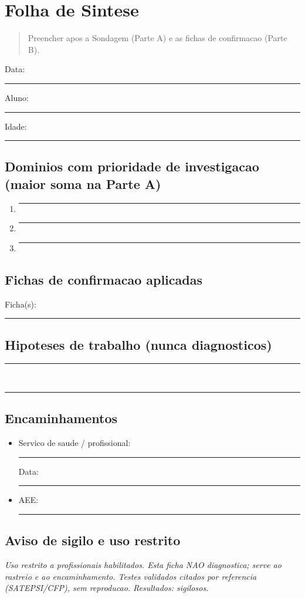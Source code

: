 \documentclass[a4paper,11pt]{book}
\newcommand{\avisolegal}{\par\medskip\noindent\footnotesize\itshape
\color{cinza}Uso restrito a profissionais habilitados. Esta ficha NAO diagnostica;
serve ao rastreio e ao encaminhamento. Testes validados citados por referencia
(SATEPSI/CFP), sem reproducao. Resultados: sigilosos.\color{black}\par}
\begin{document}
\section{Folha de Sintese}
\begin{quote}
Preencher apos a Sondagem (Parte A) e as fichas de confirmacao (Parte B).
\end{quote}

\noindent Data: \rule{3cm}{0.3pt}\quad Aluno: \rule{6cm}{0.3pt}\quad Idade: \rule{1.5cm}{0.3pt}

\subsection*{Dominios com prioridade de investigacao (maior soma na Parte A)}
\begin{enumerate}[leftmargin=2.2em]
\item \rule{12cm}{0.3pt}
\item \rule{12cm}{0.3pt}
\item \rule{12cm}{0.3pt}
\end{enumerate}

\subsection*{Fichas de confirmacao aplicadas}
\noindent Ficha(s): \rule{14cm}{0.3pt}

\subsection*{Hipoteses de trabalho (nunca diagnosticos)}
\noindent \rule{15cm}{0.3pt}\\ \rule{15cm}{0.3pt}

\subsection*{Encaminhamentos}
\begin{itemize}
\item Servico de saude / profissional: \rule{6cm}{0.3pt}\quad Data: \rule{2.5cm}{0.3pt}
\item AEE: \rule{10cm}{0.3pt}
\end{itemize}

\subsection*{Aviso de sigilo e uso restrito}
\avisolegal
\end{document}
